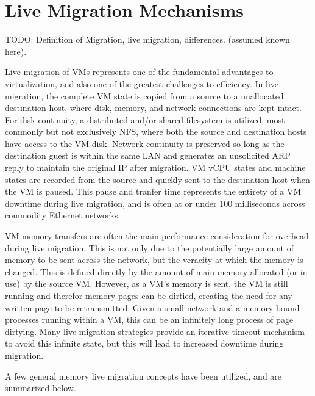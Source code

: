 \section{Live Migration Mechanisms}

TODO: Definition of Migration, live migration, differences. (assumed known here).

Live migration of VMs represents one of the fundamental advantages to virtualization, and also one of the greatest challenges to efficiency.  In live migration, the complete VM state is copied from a source to a unallocated destination host, where disk, memory, and network connections are kept intact. For disk continuity, a distributed and/or shared filesystem is utilized, most commonly but not exclusively NFS, where both the source and destination hosts have access to the VM disk.  Network continuity is preserved so long as the destination guest is within the same LAN and generates an unsolicited ARP reply to maintain the original IP after migration.  VM vCPU states and machine states are recorded from the source and quickly sent to the destination host when the VM is paused. This pause and tranfer time represents the entirety of a VM downtime during live migration, and is often at or under 100 milliseconds across  commodity Ethernet networks. 

VM memory transfers are often the main performance consideration for overhead during live migration. This is not only due to the potentially large amount of memory to be sent across the network, but the veracity at which the memory is changed.  This is defined directly by the amount of main memory allocated (or in use) by the source VM. However, as a VM's memory is sent, the VM is still running and therefor memory pages can be dirtied, creating the need for any written page to be retransmitted. Given a small network and a memory bound processes running within a VM, this can be an infinitely long process of page dirtying. Many live migration strategies provide an iterative timeout mechanism to avoid this infinite state, but this will lead to increased downtime during migration.  

A few general memory live migration concepts have been utilized, and are summarized below. 

